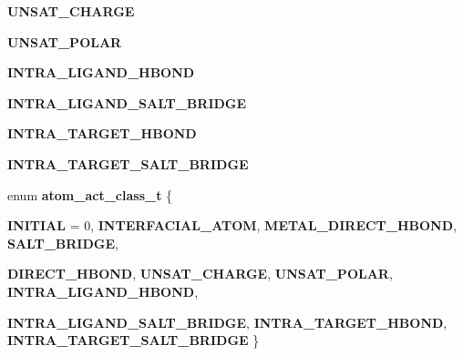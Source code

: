\begin{CompactItemize}
\item 
\textbf{UNSAT\_\-CHARGE}\label{classSimSite3D_1_1ProtLigScore_38da0bbb70c6f5a88b37e99939fa72113a2e21f3f5eb470e89630ace57fca557}

\item 
\textbf{UNSAT\_\-POLAR}\label{classSimSite3D_1_1ProtLigScore_38da0bbb70c6f5a88b37e99939fa721193ca1d17e498b2126dd19ebeb0f93abf}

\item 
\textbf{INTRA\_\-LIGAND\_\-HBOND}\label{classSimSite3D_1_1ProtLigScore_38da0bbb70c6f5a88b37e99939fa721131df05afc5bf7240b89d5a0b09b0404b}

\item 
\textbf{INTRA\_\-LIGAND\_\-SALT\_\-BRIDGE}\label{classSimSite3D_1_1ProtLigScore_38da0bbb70c6f5a88b37e99939fa72119f36f771a2f0c2060396f693a09097aa}

\item 
\textbf{INTRA\_\-TARGET\_\-HBOND}\label{classSimSite3D_1_1ProtLigScore_38da0bbb70c6f5a88b37e99939fa7211465a604ea7061692e2e210b6b5d50a72}

\item 
\textbf{INTRA\_\-TARGET\_\-SALT\_\-BRIDGE}\label{classSimSite3D_1_1ProtLigScore_38da0bbb70c6f5a88b37e99939fa7211a154b072dd519a883d0b7b9b5c3b1055}

\item 
enum \textbf{atom\_\-act\_\-class\_\-t} \{ \par
\textbf{INITIAL} =  0, 
\textbf{INTERFACIAL\_\-ATOM}, 
\textbf{METAL\_\-DIRECT\_\-HBOND}, 
\textbf{SALT\_\-BRIDGE}, 
\par
\textbf{DIRECT\_\-HBOND}, 
\textbf{UNSAT\_\-CHARGE}, 
\textbf{UNSAT\_\-POLAR}, 
\textbf{INTRA\_\-LIGAND\_\-HBOND}, 
\par
\textbf{INTRA\_\-LIGAND\_\-SALT\_\-BRIDGE}, 
\textbf{INTRA\_\-TARGET\_\-HBOND}, 
\textbf{INTRA\_\-TARGET\_\-SALT\_\-BRIDGE}
 \}
\end{CompactItemize}
